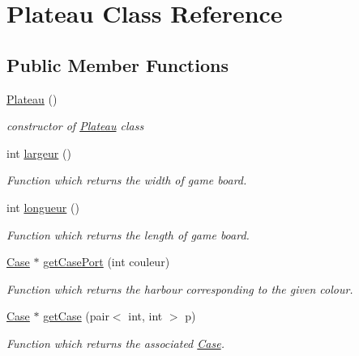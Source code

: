 \hypertarget{class_plateau}{
\section{Plateau Class Reference}
\label{class_plateau}
}
\subsection*{Public Member Functions}
\begin{DoxyCompactItemize}
\item 
\hypertarget{class_plateau_a07026170529dd928238ee45de0a797d7}{
\hyperlink{class_plateau_a07026170529dd928238ee45de0a797d7}{Plateau} ()}
\label{class_plateau_a07026170529dd928238ee45de0a797d7}

\begin{DoxyCompactList}\small\item\em constructor of \hyperlink{class_plateau}{Plateau} class \item\end{DoxyCompactList}\item 
int \hyperlink{class_plateau_a95ff4dab82132a10358e83e8b35bb23a}{largeur} ()
\begin{DoxyCompactList}\small\item\em Function which returns the width of game board. \item\end{DoxyCompactList}\item 
int \hyperlink{class_plateau_a45df9e678f054afdd28ea46a54b8c7c3}{longueur} ()
\begin{DoxyCompactList}\small\item\em Function which returns the length of game board. \item\end{DoxyCompactList}\item 
\hyperlink{class_case}{Case} $\ast$ \hyperlink{class_plateau_aaf1a05fadd84bb14fd4580c7cfa93fdf}{getCasePort} (int couleur)
\begin{DoxyCompactList}\small\item\em Function which returns the harbour corresponding to the given colour. \item\end{DoxyCompactList}\item 
\hyperlink{class_case}{Case} $\ast$ \hyperlink{class_plateau_a07d8b65d2e41442e00476c758efd9c3b}{getCase} (pair$<$ int, int $>$ p)
\begin{DoxyCompactList}\small\item\em Function which returns the associated \hyperlink{class_case}{Case}. \item\end{DoxyCompactList}\item 

\end{DoxyCompactItemize}
